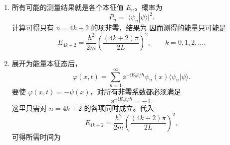 \begin{question}
\begin{solution}
\begin{enumerate}[label=(\arabic*),leftmargin=2.5em]
  \item 所有可能的测量结果就是各个本征值 $E_n$。概率为
  \[
  P_n=|\langle \psi_n|\psi\rangle|^2.
  \]
  计算可得只有 $n=4k+2$ 的项非零，结果为
  因而测得的能量只可能是
  \[
  E_{4k+2}=\frac{\hbar^2}{2m}\left(\frac{(4k+2)\pi}{2L}\right)^2,
  \qquad k=0,1,2,\dots.
  \]

  \item 展开为能量本征态后，
  \[
  \varphi(x,t)=\sum_{n=1}^{\infty}\ee^{-\ii E_nt/\hbar}\psi_n(x)\langle \psi_n|\psi\rangle.
  \]
  要使 $\varphi(x,t)=-\psi(x)$，对所有非零系数都必须满足
  \[
  \ee^{-\ii E_nt/\hbar}=-1.
  \]
  这里只需对 $n=4k+2$ 的各项同时成立。代入
  \[
  E_{4k+2}=\frac{\hbar^2}{2m}\left(\frac{(4k+2)\pi}{2L}\right)^2,
  \]
  可得所需时间为
\end{enumerate}
\end{solution}
\end{question}

